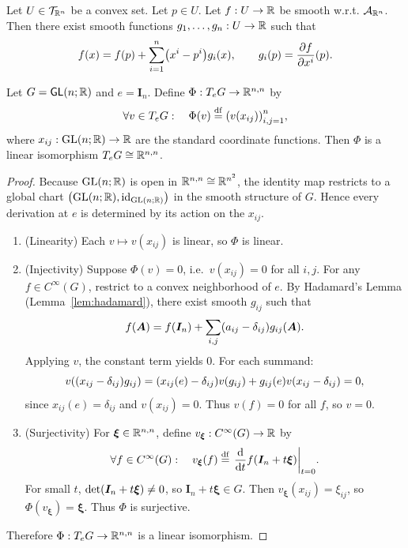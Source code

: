 \documentclass[11pt,reqno]{amsart}
\begin{document}
\begin{lemma}[Hadamard]\label{lem:hadamard}
  Let $U\in\mathcal{T}_{\mathbb{R}^n}$ be a convex set.
  Let $p\in U$. Let $f:U\to\mathbb{R}$ be smooth w.r.t. $\mathcal{A}_{\mathbb{R}^n}$.
  Then there exist smooth functions $g_1,\dots,g_n:U\to\mathbb{R}$ such that
  \[
  f(x) = f(p) + \sum_{i=1}^n\Br{x^i-p^i}g_i(x),
  \qquad
  g_i(p) = \frac{\partial f}{\partial x^i}(p).
  \]
\end{lemma}

\begin{lemma}\label{lem:gl-identification}
  Let $G=\operatorname{\mathsf{GL}}(n;\mathbb{R})$ and $e=\bm I_n$.
  Define $\Phi:T_e G\to\mathbb{R}^{n,n}$ by
  \[
    \forall v\in T_e G:\quad
    \Phi(v)\df\Br{v(x_{ij})}_{i,j=1}^n,
  \]
  where $x_{ij}:\operatorname{GL}(n;\mathbb{R})\to\mathbb{R}$ are the standard coordinate functions.
  Then $\Phi$ is a linear isomorphism $T_e G\cong\mathbb{R}^{n,n}$.
\end{lemma}
\begin{proof}
  Because $\operatorname{GL}(n;\mathbb{R})$ is open in $\mathbb{R}^{n,n}\cong\mathbb{R}^{n^2}$,
  the identity map restricts to a global chart
  $\Br{\GLset(n;\R),\id_{\GLset(n;\R)}}$ in the smooth structure of $G$.
  Hence every derivation at $e$ is determined by its action on the $x_{ij}$.

  \begin{enumerate}
  \item (Linearity) Each $v\mapsto v(x_{ij})$ is linear, so $\Phi$ is linear.

  \item (Injectivity) Suppose $\Phi(v)=0$, i.e.\ $v(x_{ij})=0$ for all $i,j$.
  For any $f\in C^\infty(G)$, restrict to a convex neighborhood of $e$.
  By Hadamard's Lemma (Lemma~\ref{lem:hadamard}), there exist smooth $g_{ij}$ such that
  \[
    f(\bm A) = f(\bm I_n) + \sum_{i,j} \Br{a_{ij}-\delta_{ij}}g_{ij}(\bm A).
  \]
  Applying $v$, the constant term yields $0$.  For each summand:
  \[
    v\Br{\Br{x_{ij}-\delta_{ij}}g_{ij}}
    = \Br{x_{ij}(e)-\delta_{ij}}v(g_{ij}) + g_{ij}(e)v\Br{x_{ij}-\delta_{ij}}
    = 0,
  \]
  since $x_{ij}(e)=\delta_{ij}$ and $v(x_{ij})=0$.  Thus $v(f)=0$ for all $f$, so $v=0$.

  \item (Surjectivity) For $\bm\xi\in\mathbb{R}^{n,n}$, define
  $v_{\bm\xi}:C^\infty(G)\to\mathbb{R}$ by
  \[
    \forall f\in C^\infty(G):\quad
    v_{\bm\xi}(f)\df\eval{\frac{\dd}{\dd t} f(\bm I_n + t\bm\xi)}_{t=0}.
  \]
  For small $t$, $\det\Br{\bm I_n+t\bm\xi}\neq 0$, so $\bm I_n+t\bm\xi\in G$.
  Then $v_{\bm\xi}(x_{ij})=\xi_{ij}$, so $\Phi(v_{\bm\xi})=\bm\xi$.
  Thus $\Phi$ is surjective.
  \end{enumerate}
  Therefore $\Phi:T_e G\to\mathbb{R}^{n,n}$ is a linear isomorphism.
\end{proof}
\end{document}
